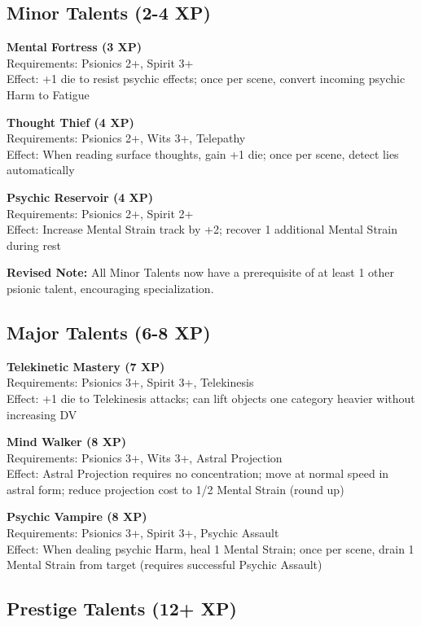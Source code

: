 \documentclass[11pt,twoside]{article}
\begin{document}
\subsection{Minor Talents (2-4 XP)}

\textbf{Mental Fortress (3 XP)} \\
Requirements: Psionics 2+, Spirit 3+ \\
Effect: +1 die to resist psychic effects; once per scene, convert incoming psychic Harm to Fatigue

\textbf{Thought Thief (4 XP)} \\
Requirements: Psionics 2+, Wits 3+, Telepathy \\
Effect: When reading surface thoughts, gain +1 die; once per scene, detect lies automatically

\textbf{Psychic Reservoir (4 XP)} \\
Requirements: Psionics 2+, Spirit 2+ \\
Effect: Increase Mental Strain track by +2; recover 1 additional Mental Strain during rest

\textbf{Revised Note:} All Minor Talents now have a prerequisite of at least 1 other psionic talent, encouraging specialization.

\subsection{Major Talents (6-8 XP)}

\textbf{Telekinetic Mastery (7 XP)} \\
Requirements: Psionics 3+, Spirit 3+, Telekinesis \\
Effect: +1 die to Telekinesis attacks; can lift objects one category heavier without increasing DV

\textbf{Mind Walker (8 XP)} \\
Requirements: Psionics 3+, Wits 3+, Astral Projection \\
Effect: Astral Projection requires no concentration; move at normal speed in astral form; reduce projection cost to 1/2 Mental Strain (round up)

\textbf{Psychic Vampire (8 XP)} \\
Requirements: Psionics 3+, Spirit 3+, Psychic Assault \\
Effect: When dealing psychic Harm, heal 1 Mental Strain; once per scene, drain 1 Mental Strain from target (requires successful Psychic Assault)

\subsection{Prestige Talents (12+ XP)}
\end{document}

